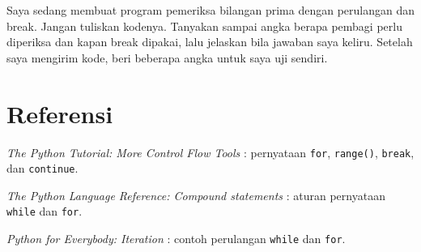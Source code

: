\begin{enumerate}
  \begin{promptterarah}
  Saya sedang membuat program pemeriksa bilangan prima dengan perulangan dan break. Jangan tuliskan kodenya. Tanyakan sampai angka berapa pembagi perlu diperiksa dan kapan break dipakai, lalu jelaskan bila jawaban saya keliru. Setelah saya mengirim kode, beri beberapa angka untuk saya uji sendiri.
  \end{promptterarah}
\end{enumerate}

\section*{Referensi}
\begin{daftarrapat}
  \item \textit{The Python Tutorial: More Control Flow Tools} \cite{py-tut-controlflow}: pernyataan \texttt{for}, \texttt{range()}, \texttt{break}, dan \texttt{continue}.
  \item \textit{The Python Language Reference: Compound statements} \cite{py-ref-compound}: aturan pernyataan \texttt{while} dan \texttt{for}.
  \item \textit{Python for Everybody: Iteration} \cite{py4e-iterations}: contoh perulangan \texttt{while} dan \texttt{for}.
\end{daftarrapat}
